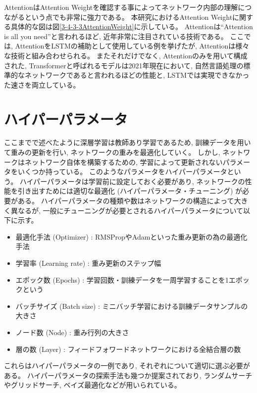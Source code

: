 AttentionはAttention Weightを確認する事によってネットワーク内部の理解につながるという点でも非常に強力である。
本研究におけるAttention Weightに関する具体的な図は図\ref{3-4-3-3AttentionWeight}に示している。
Attentionは``Attention is all you need\cite{AttentionIsAllYouNeed}''と言われるほど, 近年非常に注目されている技術である。
ここでは, AttentionをLSTMの補助として使用している例を挙げたが, Attentionは様々な技術と組み合わせられる。
またそれだけでなく, Attentionのみを用いて構成された, Transformerと呼ばれるモデルは2021年現在において, 自然言語処理の標準的なネットワークであると言われるほどの性能と, LSTMでは実現できなかった速さを両立している。

\newpage
\section{ハイパーパラメータ} \label{DL:HyperParameter}

ここまでで述べたように深層学習は教師あり学習であるため, 訓練データを用いて重みの更新を行い, ネットワークの重みを最適化していく。
しかし, ネットワークはネットワーク自体を構築するための, 学習によって更新されないパラメータをいくつか持っている。
このようなパラメータをハイパーパラメータという。
ハイパーパラメータは学習前に設定しておく必要があり, ネットワークの性能を引き出すためには適切な最適化 (ハイパーパラメータ・チューニング) が必要がある。
ハイパーパラメータの種類や数はネットワークの構造によって大きく異なるが, 一般にチューニングが必要とされるハイパーパラメータについて以下に示す。

\begin{itemize}
  \item 最適化手法 (Optimizer) : RMSPropやAdamといった重み更新の為の最適化手法
  \item 学習率 (Learning rate) : 重み更新のステップ幅
  \item エポック数 (Epochs) : 学習回数・訓練データを一周学習することを1エポックという
  \item バッチサイズ (Batch size) : ミニバッチ学習における訓練データサンプルの大きさ
  \item ノード数 (Node) : 重み行列の大きさ
  \item 層の数 (Layer) : フィードフォワードネットワークにおける全結合層の数
\end{itemize}

これらはハイパーパラメータの一例であり, それぞれについて適切に選ぶ必要がある。
ハイパーパラメータの探索手法も幾つか提案されており, ランダムサーチやグリッドサーチ, ベイズ最適化などが用いられている。

